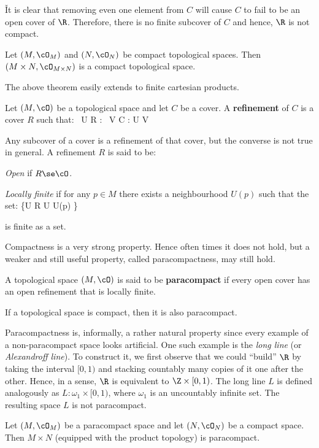 \v

It is clear that removing even one element from $C$ will cause $C$ to fail to be an open cover of $\R$. Therefore,
there is no finite subcover of $C$ and hence, $\R$ is not compact.
\ee

\bt[]
Let $(M,\cO_M)$ and $(N,\cO_N)$ be compact topological spaces. Then $ (M\times N,\cO_{M\times N})$ is a compact
topological space.
\et

The above theorem easily extends to finite cartesian products.

\bd [Refinement]
Let $(M,\cO)$ be a topological space and let $C$ be a cover. A \textbf{refinement} of $C$ is a cover $R$ such that:
\bse
\forall \, U \in R : \exists \, V \in C : U \se V
\ese
\ed

Any subcover of a cover is a refinement of that cover, but the converse is not true in general. A refinement $R$ is
said to be:
\bit
\item \emph{Open} if $R\se \cO$.
\item \emph{Locally finite} if for any $p\in M$ there exists a neighbourhood $U(p)$ such that the set:
\bse
\{U \in R \mid U \cap U(p) \neq \vn\}
\ese

is finite as a set.
\eit

Compactness is a very strong property. Hence often times it does not hold, but a weaker and still useful property,
called paracompactness, may still hold.

A topological space $(M,\cO)$ is said to be \textbf{paracompact} if every open cover has an open refinement that is
locally finite.
\ed

\bt[]
If a topological space is compact, then it is also paracompact.
\et

Paracompactness is, informally, a rather natural property since every example of a non-paracompact space looks
artificial. One such example is the \emph{long line} (or \emph{Alexandroff line}). To construct it, we first observe
that we could ``build'' $\R$ by taking the interval $[0,1)$ and stacking countably many copies of it one after the
other. Hence, in a sense, $\R$ is equivalent to $\Z \times [0,1)$. The long line $L$ is defined analogously as
$L:\omega_1\times [0,1)$, where $\omega_1$ is an uncountably infinite set. The resulting space $L$ is not paracompact.

\bt[]
Let $(M,\cO_M)$ be a paracompact space and let $(N,\cO_N)$ be a compact space. Then $M\times N$ (equipped with the
product topology) is paracompact.
\et

